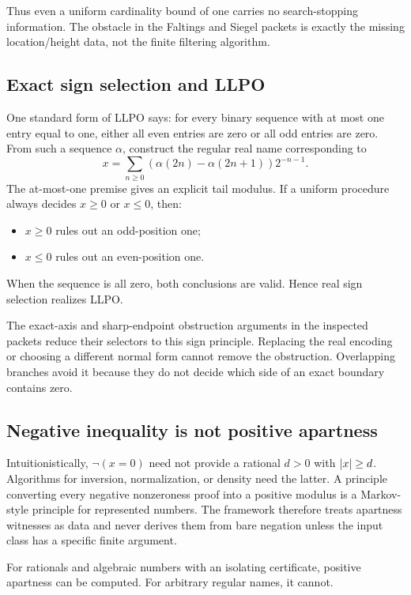 Thus even a uniform cardinality bound of one carries no search-stopping
information.  The obstacle in the Faltings and Siegel packets is exactly the
missing location/height data, not the finite filtering algorithm.

\subsection{Exact sign selection and LLPO}

One standard form of LLPO says: for every binary sequence with at most one
entry equal to one, either all even entries are zero or all odd entries are
zero.  From such a sequence \(\alpha\), construct the regular real name
corresponding to
\[
 x=\sum_{n\ge0}(\alpha(2n)-\alpha(2n+1))2^{-n-1}.
\]
The at-most-one premise gives an explicit tail modulus.  If a uniform
procedure always decides \(x\ge0\) or \(x\le0\), then:
\begin{itemize}
\item \(x\ge0\) rules out an odd-position one;
\item \(x\le0\) rules out an even-position one.
\end{itemize}
When the sequence is all zero, both conclusions are valid.  Hence real sign
selection realizes LLPO.

The exact-axis and sharp-endpoint obstruction arguments in the inspected
packets reduce their selectors to this sign principle.  Replacing the real
encoding or choosing a different normal form cannot remove the obstruction.
Overlapping branches avoid it because they do not decide which side of an
exact boundary contains zero.

\subsection{Negative inequality is not positive apartness}

Intuitionistically, \(\neg(x=0)\) need not provide a rational \(d>0\) with
\(\left|x\right|\ge d\).  Algorithms for inversion, normalization, or density need
the latter.  A principle converting every negative nonzeroness proof into a
positive modulus is a Markov-style principle for represented numbers.  The
framework therefore treats apartness witnesses as data and never derives them
from bare negation unless the input class has a specific finite argument.

For rationals and algebraic numbers with an isolating certificate, positive
apartness can be computed.  For arbitrary regular names, it cannot.

